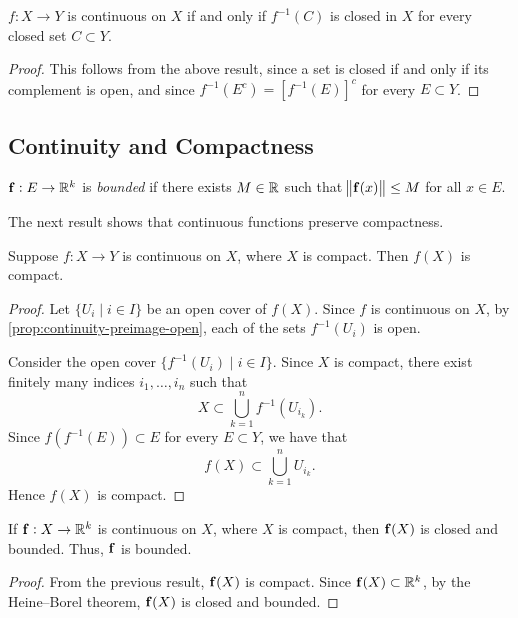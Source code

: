 \begin{corollary}\label{cor:continuity-preimage-closed}
$f:X\to Y$ is continuous on $X$ if and only if $f^{-1}(C)$ is closed in $X$ for every closed set $C\subset Y$.
\end{corollary}

\begin{proof}
This follows from the above result, since a set is closed if and only if its complement is open, and since $f^{-1}(E^c)=[f^{-1}(E)]^c$ for every $E\subset Y$.
\end{proof}
\pagebreak

\subsection{Continuity and Compactness}
\begin{definition}
$\vb{f}:E\to\mathbb R^k$ is \emph{bounded} if there exists $M\in\mathbb R$ such that $\norm{\vb{f}(x)}\le M$ for all $x\in E$.
\end{definition}

The next result shows that continuous functions preserve compactness.
\begin{proposition}\label{prop:continuity-image-compact}
Suppose $f:X\to Y$ is continuous on $X$, where $X$ is compact. Then $f(X)$ is compact.
\end{proposition}

\begin{proof}
Let $\{U_i\mid i\in I\}$ be an open cover of $f(X)$. Since $f$ is continuous on $X$, by \cref{prop:continuity-preimage-open}, each of the sets $f^{-1}(U_i)$ is open.

Consider the open cover $\{f^{-1}(U_i)\mid i\in I\}$. Since $X$ is compact, there exist finitely many indices $i_1,\dots,i_n$ such that
\[X\subset\bigcup_{k=1}^{n}f^{-1}(U_{i_k}).\]
Since $f(f^{-1}(E))\subset E$ for every $E\subset Y$, we have that
\[f(X)\subset\bigcup_{k=1}^{n}U_{i_k}.\]
Hence $f(X)$ is compact.
\end{proof}

\begin{corollary}
If $\vb{f}:X\to\mathbb R^k$ is continuous on $X$, where $X$ is compact, then $\vb{f}(X)$ is closed and bounded. Thus, $\vb{f}$ is bounded.
\end{corollary}

\begin{proof}
From the previous result, $\vb{f}(X)$ is compact. Since $\vb{f}(X)\subset\mathbb R^k$, by the Heine--Borel theorem, $\vb{f}(X)$ is closed and bounded.
\end{proof}

